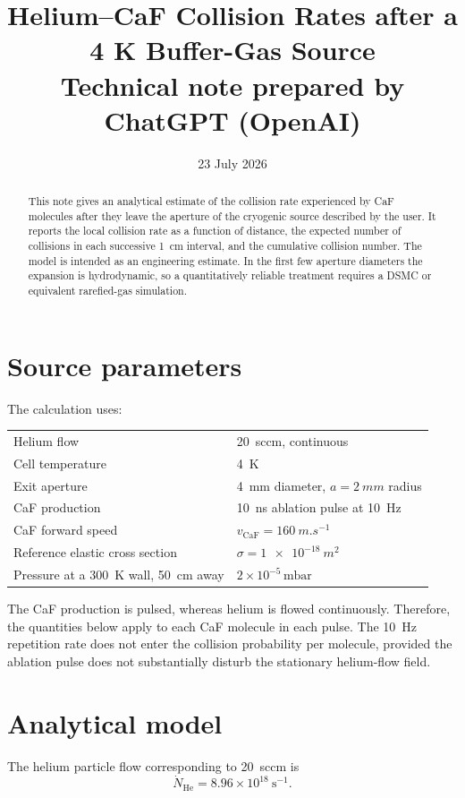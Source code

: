 \documentclass[11pt,a4paper]{article}
\title{Helium--CaF Collision Rates after a 4 K Buffer-Gas Source\\[4pt]
\large Technical note prepared by ChatGPT (OpenAI)}
\author{}
\date{23 July 2026}
\begin{document}
\maketitle

\begin{abstract}
This note gives an analytical estimate of the collision rate experienced by CaF molecules after they leave the aperture of the cryogenic source described by the user. It reports the local collision rate as a function of distance, the expected number of collisions in each successive \SI{1}{cm} interval, and the cumulative collision number. The model is intended as an engineering estimate. In the first few aperture diameters the expansion is hydrodynamic, so a quantitatively reliable treatment requires a DSMC or equivalent rarefied-gas simulation.
\end{abstract}

\section{Source parameters}
The calculation uses:
\begin{center}
\begin{tabular}{@{}ll@{}}
\toprule
Helium flow & \SI{20}{sccm}, continuous \\
Cell temperature & \SI{4}{K} \\
Exit aperture & \SI{4}{mm} diameter, $a=\SI{2}{mm}$ radius \\
CaF production & \SI{10}{ns} ablation pulse at \SI{10}{Hz} \\
CaF forward speed & $v_{\mathrm{CaF}}=\SI{160}{m.s^{-1}}$ \\
Reference elastic cross section & $\sigma=\SI{1e-18}{m^2}$ \\
Pressure at a \SI{300}{K} wall, \SI{50}{cm} away & $2\times10^{-5}\,\mathrm{mbar}$ \\
\bottomrule
\end{tabular}
\end{center}

The CaF production is pulsed, whereas helium is flowed continuously. Therefore, the quantities below apply to each CaF molecule in each pulse. The \SI{10}{Hz} repetition rate does not enter the collision probability per molecule, provided the ablation pulse does not substantially disturb the stationary helium-flow field.

\section{Analytical model}
The helium particle flow corresponding to \SI{20}{sccm} is
\begin{equation}
\dot N_{\mathrm{He}} = 8.96\times10^{18}\ \mathrm{s^{-1}}.
\end{equation}
\end{document}
